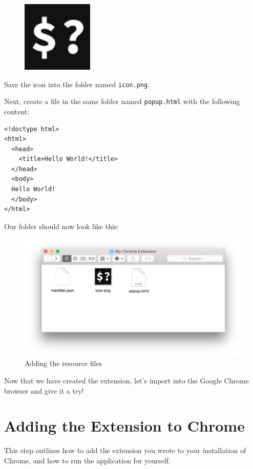 \documentclass[11pt]{article}
\begin{document}
	\begin{figure}[htb]
	\centering
	\includegraphics[width=.1\textwidth]{figures/icon128.png}
	\end{figure}

Save the icon into the folder named \texttt{icon.png}. 

Next, create a file in the same folder named \texttt{popup.html} with the following content:
\begin{lstlisting}[mathescape]
<!doctype html>
<html>
  <head>
    <title>Hello World!</title>
  </head>
  <body>
  Hello World!
  </body>
</html>
\end{lstlisting}

Our folder should now look like this:

	\begin{figure}[htb]
	\centering
	\includegraphics[width=\textwidth]{figures/all.png}
	\vspace*{-2.5em}
	\caption{Adding the resource files\label{fig:all}}
	\end{figure}

Now that we have created the extension, let's import into the Google Chrome browser and give it a try!

\section{Adding the Extension to Chrome}

This step outlines how to add the extension you wrote to your installation of Chrome, and how to run the application for yourself.
\end{document}
